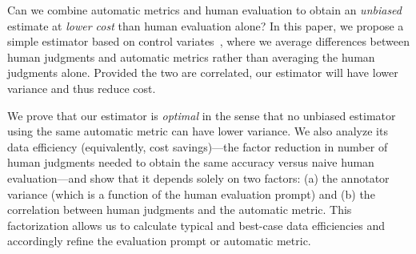 Can we combine automatic metrics and human evaluation to obtain
an \emph{unbiased} estimate at \emph{lower cost} than human evaluation alone?
In this paper,
we propose a simple estimator based on control variates~\citep{ripley2009stochastic},
where we average differences between human judgments and automatic metrics
rather than averaging the human judgments alone.
Provided the two are correlated,
our estimator will have lower variance and thus reduce cost.

We prove that our estimator is \emph{optimal} in the sense
that no unbiased estimator using the same automatic metric can have lower variance.
We also analyze its data efficiency (equivalently, cost savings)---the factor reduction in number of human judgments needed to obtain the same accuracy versus naive human evaluation---and show that it depends solely on
two factors:
  (a) the annotator variance (which is a function of the human evaluation prompt) and
  (b) the correlation between human judgments and the automatic metric.
This factorization allows us to calculate typical and best-case data efficiencies and accordingly refine the evaluation prompt or automatic metric.

